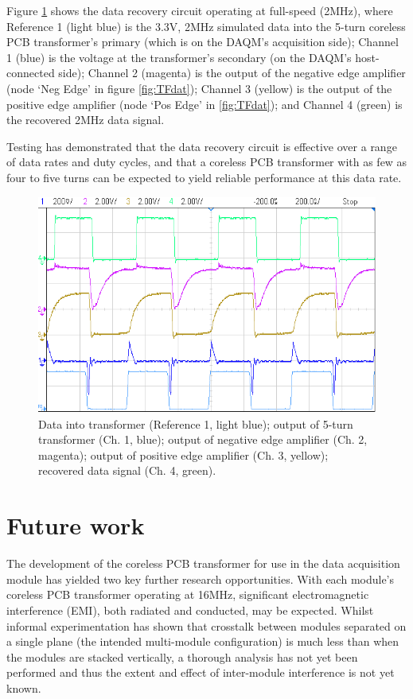 \documentclass[conference]{IEEEtran}
\begin{document}
	Figure \ref{fig:Data} shows the data recovery circuit operating at full-speed (2MHz), where Reference 1 (light blue) is the 3.3V, 2MHz simulated data into the 5-turn coreless PCB transformer's primary (which is on the DAQM's acquisition side); Channel 1 (blue) is the voltage at the transformer's secondary (on the DAQM's host-connected side); Channel 2 (magenta) is the output of the negative edge amplifier (node `Neg Edge' in figure \ref{fig:TFdat}); Channel 3 (yellow) is the output of the positive edge amplifier (node `Pos Edge' in \ref{fig:TFdat}); and Channel 4 (green) is the recovered 2MHz data signal.
	
	Testing has demonstrated that the data recovery circuit is effective over a range of data rates and duty cycles, and that a coreless PCB transformer with as few as four to five turns can be expected to yield reliable performance at this data rate.
	
	\begin{figure}[t]
		\centering
		\includegraphics[width=1\columnwidth]{./img/2M_Cropped}
		\caption{Data into transformer (Reference 1, light blue); output of 5-turn transformer (Ch. 1, blue); output of negative edge amplifier (Ch. 2, magenta); output of positive edge amplifier (Ch. 3, yellow); recovered data signal (Ch. 4, green).}
		\label{fig:Data}
	\end{figure}

\section{Future work}
The development of the coreless PCB transformer for use in the data acquisition module has yielded two key further research opportunities.  
With each module's coreless PCB transformer operating at 16MHz, significant electromagnetic interference (EMI), both radiated and conducted, may be expected.  Whilst informal experimentation has shown that crosstalk between modules separated on a single plane (the intended multi-module configuration) is much less than when the modules are stacked vertically, a thorough analysis has not yet been performed and thus the extent and effect of inter-module interference is not yet known.  
\end{document}
